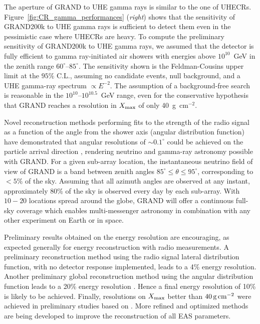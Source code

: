 \documentclass[a4paper,11pt]{article}
\begin{document}
The aperture of GRAND to UHE gamma rays is similar to the one of UHECRs. Figure~\ref{fig:CR_gamma_performances} ({\it right}) shows that the sensitivity of GRAND200k to UHE gamma rays is sufficient to detect them even in the pessimistic case where UHECRs are heavy. To compute the preliminary sensitivity of GRAND200k to UHE gamma rays, we assumed that the detector is fully efficient to gamma ray-initiated air showers with energies above $10^{10}$~GeV in the zenith range $60^{\circ}$--$85^{\circ}$.  The sensitivity shown is the Feldman-Cousins upper limit at the $95\%$ C.L., assuming no candidate events, null background, and a UHE gamma-ray spectrum $\propto E^{-2}$.  The assumption of a background-free search is reasonable in the $10^{10}$--$10^{10.5}$~GeV range, even for the conservative hypothesis that GRAND reaches a resolution in $X_{\rm max}$ of only 40~g~cm$^{-2}$. 

Novel reconstruction methods performing fits to the strength of the radio signal as a function of the angle from the shower axis (angular distribution function) have demonstrated that angular resolutions of $\sim 0.1^\circ$ could be achieved on the particle arrival direction \cite{DecoenePhD, Decoene_ICRC2021}, rendering neutrino and gamma-ray astronomy possible with GRAND. 
For a given sub-array location, the instantaneous neutrino field of view of GRAND is a band between zenith angles $85^\circ{\leq}\theta {\leq}95^\circ$, 
corresponding to ${<}5\%$ of the sky.  
Assuming that all azimuth angles are observed at any instant, 
approximately 80\% of the sky is observed every day by each sub-array. With $10-20$ locations spread around the globe, GRAND will offer a continuous full-sky coverage which enables multi-messenger astronomy in combination with any other experiment on Earth or in space.

Preliminary results obtained on the energy resolution are encouraging, as expected generally for energy reconstruction with radio measurements. A preliminary reconstruction method using the radio signal lateral distribution function, with no detector response implemented, leads to a 4\% energy resolution. Another preliminary global reconstruction method using the angular distribution function leads to a 20\% energy resolution \cite{Decoene_ICRC2021}. Hence a final energy resolution of 10\% is likely to be achieved. 
Finally, resolutions on $X_{\rm max}$ better than $40\,{\rm g}\,{\rm cm}^{-2}$ were achieved in preliminary studies based on \cite{Buitink:2014eqa}. More refined and optimized methods are being developed to improve the reconstruction of all EAS parameters. 
\end{document}
